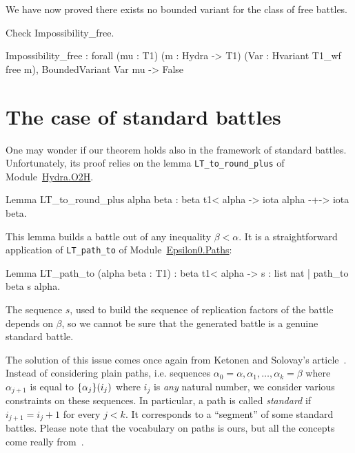 We have now proved there exists no bounded variant for the class of free battles.

 
\begin{Coqsrc}
Check Impossibility_free.
\end{Coqsrc}

\begin{Coqanswer}
Impossibility_free
     : forall (mu : T1) (m : Hydra -> T1) (Var : Hvariant T1_wf free m),
       BoundedVariant Var mu -> False
\end{Coqanswer}
  



\section{The case of standard battles}
\label{sec:standard-intro}\label{std-case}
One may wonder if our theorem holds also in the framework of standard battles. Unfortunately, its proof relies on the lemma \texttt{LT\_to\_round\_plus} of
Module~\href{../theories/html/hydras.Hydra.O2H.html}{Hydra.O2H}.

\begin{Coqsrc}
Lemma LT_to_round_plus alpha beta :
    beta t1< alpha ->  iota alpha -+-> iota beta.
\end{Coqsrc}

This lemma builds a battle out of any inequality $\beta<\alpha$. 
It is a straightforward application of \texttt{LT\_path\_to} of
Module~\href{../theories/html/hydras.Epsilon0.Paths.html}{Epsilon0.Paths}:

\begin{Coqsrc}
Lemma LT_path_to (alpha beta : T1) :
  beta t1< alpha -> {s : list nat | path_to beta s alpha}.
\end{Coqsrc}

The sequence $s$, used to build the sequence of replication factors of the battle depends on 
$\beta$, so we cannot be sure that the generated battle is a genuine standard battle.


The solution of this issue comes  once again from Ketonen and Solovay's article~\cite{KS81}. Instead of considering plain paths, i.e. sequences 
$\alpha_0=\alpha,\alpha_1,\dots,\alpha_k=\beta$ where $\alpha_{j+1}$ is equal
to $\mbox{$\{\alpha_j\}(i_j)$}$ where $i_j$ is \emph{any} natural number, 
we consider various constraints on these sequences.
In particular, a path is called \emph{standard} if $i_{j+1} = i_j + 1$ for every $j<k$.
It  corresponds to a ``segment'' of some standard battles. 
Please note that the vocabulary on paths is ours, but all the concepts come really from~\cite{KS81}.

